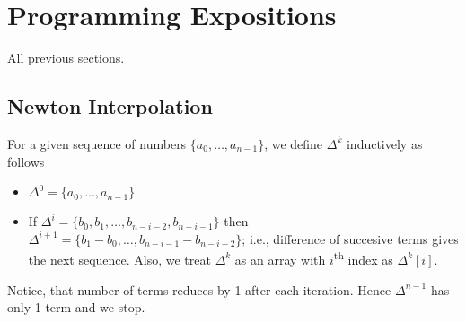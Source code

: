 \section{Programming Expositions}
\begin{topics}
All previous sections.
\end{topics}
\subsection{Newton Interpolation}
For a given sequence of numbers $\{a_0,\ldots,a_{n-1}\}$, we define $\Delta ^{k}$ inductively as follows
\begin{itemize}
	\item $\Delta ^{0}=\{a_0,\ldots,a_{n-1}\}$
	\item If $\Delta ^{i}=\{b_0,b_1,\ldots,b_{n-i-2},b_{n-i-1}\}$ then $\Delta ^{i+1}=\{b_1-b_0,\ldots,b_{n-i-1}-b_{n-i-2}\}$; i.e., difference of succesive terms gives the next sequence. Also, we treat $\Delta ^{k}$ as an array with $i$\textsuperscript{th} index as $\Delta ^{k}[i]$.
\end{itemize}
Notice, that number of terms reduces by 1 after each iteration. Hence $\Delta ^{n-1}$ has only 1 term and we stop.

